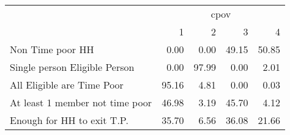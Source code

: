 \documentclass{article}
\begin{document}
\begin{table}[!h]
\centering
\begin{tabular}{lllll}
\cline{1-5}
\multicolumn{1}{c}{} &
  \multicolumn{4}{|c}{cpov} \\
\multicolumn{1}{c}{} &
  \multicolumn{1}{|r}{1} &
  \multicolumn{1}{r}{2} &
  \multicolumn{1}{r}{3} &
  \multicolumn{1}{r}{4} \\
\cline{1-5}
\multicolumn{1}{l}{Non Time poor HH} &
  \multicolumn{1}{|r}{0.00} &
  \multicolumn{1}{r}{0.00} &
  \multicolumn{1}{r}{49.15} &
  \multicolumn{1}{r}{50.85} \\
\multicolumn{1}{l}{Single person Eligible Person} &
  \multicolumn{1}{|r}{0.00} &
  \multicolumn{1}{r}{97.99} &
  \multicolumn{1}{r}{0.00} &
  \multicolumn{1}{r}{2.01} \\
\multicolumn{1}{l}{All Eligible are Time Poor} &
  \multicolumn{1}{|r}{95.16} &
  \multicolumn{1}{r}{4.81} &
  \multicolumn{1}{r}{0.00} &
  \multicolumn{1}{r}{0.03} \\
\multicolumn{1}{l}{At least 1 member not time poor} &
  \multicolumn{1}{|r}{46.98} &
  \multicolumn{1}{r}{3.19} &
  \multicolumn{1}{r}{45.70} &
  \multicolumn{1}{r}{4.12} \\
\multicolumn{1}{l}{Enough for HH to exit T.P.} &
  \multicolumn{1}{|r}{35.70} &
  \multicolumn{1}{r}{6.56} &
  \multicolumn{1}{r}{36.08} &
  \multicolumn{1}{r}{21.66} \\
\cline{1-5}
\end{tabular}
\end{table}
\end{document}
